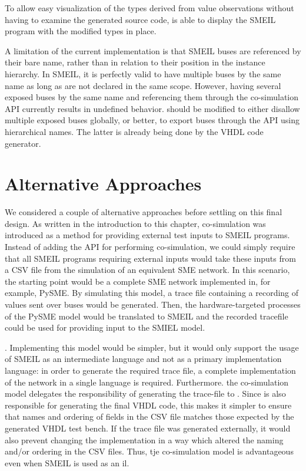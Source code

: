 To allow easy visualization of the types derived from value observations without
having to examine the generated source code, \libsme{} is able to display the
SMEIL program with the modified types in place.

A limitation of the current implementation is that SMEIL buses are referenced by
their bare name, rather than in relation to their position in the instance
hierarchy. In SMEIL, it is perfectly valid to have multiple buses by the same
name as long as are not declared in the same scope. However, having several
{\ttfamily exposed} buses by the same name and referencing them through the
co-simulation API currently results in undefined behavior. \libsme{} should be
modified to either disallow multiple {\ttfamily exposed} buses globally, or
better, to export buses through the API using hierarchical names. The latter is
already being done by the VHDL code generator.

\section{Alternative Approaches}
We considered a couple of alternative approaches before settling on this final
design. As written in the introduction to this chapter, co-simulation was
introduced as a method for providing external test inputs to SMEIL programs.
Instead of adding the API for performing co-simulation, we could simply require
that all SMEIL programs requiring external inputs would take these inputs from a
CSV file from the simulation of an equivalent SME network. In this scenario, the
starting point would be a complete SME network implemented in, for example,
PySME. By simulating this model, a trace file containing a recording of values
sent over buses would be generated. Then, the hardware-targeted processes of the
PySME model would be translated to SMEIL and the recorded tracefile could be
used for providing input to the SMIEL model.

. Implementing this model would be simpler,
but it would only support the usage of SMEIL as an intermediate language and not
as a primary implementation language: in order to generate the required trace
file, a complete implementation of the network in a single language is
required. Furthermore. the co-simulation model delegates the responsibility of
generating the trace-file to \libsme. Since \libsme is also responsible for
generating the final VHDL code, this makes it simpler to ensure that names and
ordering of fields in the CSV file matches those expected by the generated VHDL
test bench. If the trace file was generated externally, it would also prevent
changing the \libsme implementation in a way which altered the naming and/or
ordering in the CSV files. Thus, tje co-simulation model is advantageous even
when SMEIL is used as an \gls{il}.

